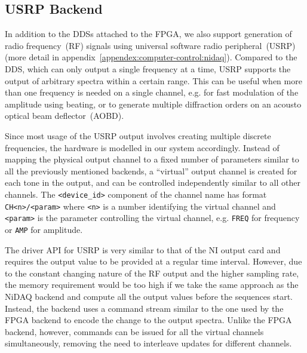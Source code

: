 \subsection{USRP Backend}
\label{ch:computer-control:backend:usrp}

In addition to the DDSs attached to the FPGA, we also support generation of
radio frequency~(RF) signals using universal software radio peripheral~(USRP)
(more detail in appendix~\ref{appendex:computer-control:nidaq}).
Compared to the DDS, which can only output a single frequency at a time,
USRP supports the output of arbitrary spectra within a certain range.
This can be useful when more than one frequency is needed on a single channel,
e.g. for fast modulation of the amplitude using beating,
or to generate multiple diffraction orders on an acousto optical beam deflector~(AOBD).

Since most usage of the USRP output involves creating multiple discrete frequencies,
the hardware is modelled in our system accordingly.
Instead of mapping the physical output channel to a fixed number of parameters
similar to all the previously mentioned backends,
a ``virtual'' output channel is created for each tone in the output,
and can be controlled independently similar to all other channels.
The \lstinline{<device_id>} component of the channel name has format \lstinline{CH<n>/<param>}
where \lstinline{<n>} is a number identifying the virtual channel
and \lstinline{<param>} is the parameter controlling the virtual channel,
e.g. \lstinline{FREQ} for frequency or \lstinline{AMP} for amplitude.

The driver API for USRP is very similar to that of the NI output card
and requires the output value to be provided at a regular time interval.
However, due to the constant changing nature of the RF output and the higher sampling rate,
the memory requirement would be too high if we take the same approach as the NiDAQ backend
and compute all the output values before the sequences start.
Instead, the backend uses a command stream similar to the one used by the FPGA backend
to encode the change to the output spectra.
Unlike the FPGA backend, however, commands can be issued
for all the virtual channels simultaneously,
removing the need to interleave updates for different channels.

